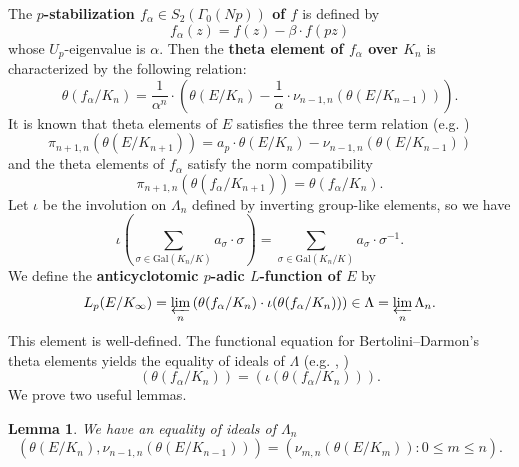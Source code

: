 \documentclass[11pt]{amsart}
\numberwithin{equation}{section}
\newtheorem{lem}[thm]{Lemma}
\theoremstyle{definition}
\begin{document}
The \textbf{$p$-stabilization $f_\alpha \in S_{2}(\Gamma_0(Np))$ of $f$} is defined by
$$f_\alpha (z) = f(z) - \beta \cdot f(pz) $$
whose $U_p$-eigenvalue is $\alpha$.
Then the \textbf{theta element of $f_\alpha$ over $K_n$} is characterized by the following relation:
\begin{equation} \label{eqn:p-stabilization}
\theta(f_\alpha/K_n) = \dfrac{1}{\alpha^n} \cdot \left(  \theta(E/K_n) - \dfrac{1}{\alpha} \cdot \nu_{n-1, n}( \theta(E/K_{n-1}) )  \right) .
\end{equation}
It is known that theta elements of $E$ satisfies the three term relation (e.g. \cite[Lem. 2.6]{darmon-iovita})
\begin{equation} \label{eqn:three-term-relation}
\pi_{n+1, n} \left( \theta(E/K_{n+1}) \right) = a_p \cdot \theta(E/K_n) - \nu_{n-1, n} \left( \theta(E/K_{n-1}) \right)
\end{equation}
and the theta elements of $f_\alpha$ satisfy the norm compatibility
\begin{equation} \label{eqn:norm-compatibility}
\pi_{n+1, n} \left( \theta(f_\alpha/K_{n+1}) \right)=  \theta(f_\alpha/K_{n}) .
\end{equation}
Let $\iota$ be the involution on $\Lambda_n$ defined by inverting group-like elements, so we have
 $$\iota( \sum_{\sigma \in \mathrm{Gal}(K_n/K)} a_{\sigma} \cdot \sigma ) = \sum_{\sigma \in \mathrm{Gal}(K_n/K)} a_{\sigma} \cdot \sigma^{-1}.$$
We define the \textbf{anticyclotomic $p$-adic $L$-function of $E$} by
$$L_p(E/K_\infty) =   \varprojlim_n\left(  \theta(f_\alpha/K_n) \cdot \iota( \theta(f_\alpha/K_n) ) \right) \in \Lambda = \varprojlim_n \Lambda_n.$$
This element is well-defined.
The functional equation for Bertolini--Darmon's theta elements yields the equality of ideals of $\Lambda$
(e.g. \cite[Prop. 2.13]{bertolini-darmon-mumford-tate-1996}, \cite[Lem. 1.5]{bertolini-darmon-imc-2005})
\begin{equation} \label{eqn:f-e}
\left( \theta(f_\alpha/K_n) \right) = \left( \iota( \theta(f_\alpha/K_n) ) \right).
\end{equation}
We prove two useful lemmas.
\begin{lem} \label{lem:reduction-generators}
We have an equality of ideals of $\Lambda_n$
$$\left( \theta(E/K_n) , \nu_{n-1, n} \left( \theta(E/K_{n-1}) \right) \right) = \left( \nu_{m, n} \left( \theta(E/K_{m}) \right) : 0 \leq m \leq n \right) .$$
\end{lem}
\end{document}
